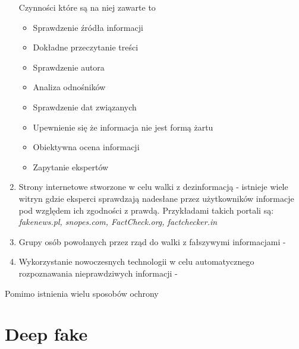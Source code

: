 \begin{enumerate}
    Czynności które są na niej zawarte to 
    \begin{itemize}
        \item Sprawdzenie źródła informacji
        \item Dokładne przeczytanie treści
        \item Sprawdzenie autora
        \item Analiza odnośników 
        \item Sprawdzenie dat związanych 
        \item Upewnienie się że informacja nie jest formą żartu
        \item Obiektywna ocena informacji
        \item Zapytanie ekspertów
    \end{itemize}
    \item Strony internetowe stworzone w celu walki z dezinformacją - istnieje
    wiele witryn gdzie eksperci sprawdzają nadesłane przez użytkowników informacje
    pod względem ich zgodności z prawdą.
    Przykładami takich portali są: \emph{fakenews.pl, snopes.com, FactCheck.org, factchecker.in}
    \item Grupy osób powołanych przez rząd do walki z fałszywymi informacjami -
    \item Wykorzystanie nowoczesnych technologii w celu automatycznego rozpoznawania
    nieprawdziwych informacji - 
\end{enumerate}
Pomimo istnienia wielu sposobów ochrony 
\section{Deep fake}
